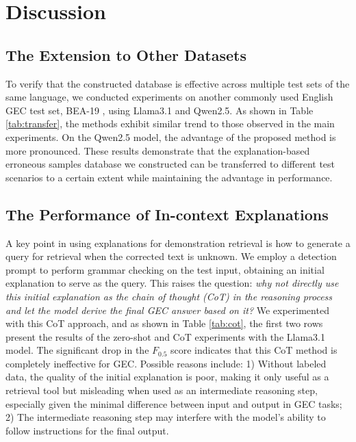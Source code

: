 

\section{Discussion}
\subsection{The Extension to Other Datasets}



To verify that the constructed database is effective across multiple test sets of the same language, we conducted experiments on another commonly used English GEC test set, BEA-19 \cite{bryant-etal-2019-bea-19}, using Llama3.1 and Qwen2.5. As shown in Table \ref{tab:transfer}, the methods exhibit similar trend to those observed in the main experiments. On the Qwen2.5 model, the advantage of the proposed method is more pronounced. These results demonstrate that the explanation-based erroneous samples database we constructed can be transferred to different test scenarios to a certain extent while maintaining the advantage in performance.


\subsection{The Performance of In-context Explanations}
\label{sec:in-context-explanation}
A key point in using explanations for demonstration retrieval is how to generate a query for retrieval when the corrected text is unknown. We employ a detection prompt to perform grammar checking on the test input, obtaining an initial explanation to serve as the query. This raises the question: \textit{why not directly use this initial explanation as the chain of thought (CoT) in the reasoning process and let the model derive the final GEC answer based on it?} We experimented with this CoT approach, and as shown in Table \ref{tab:cot}, the first two rows present the results of the zero-shot and CoT experiments with the Llama3.1 model. The significant drop in the $F_{0.5}$ score indicates that this CoT method is completely ineffective for GEC. Possible reasons include: 1) Without labeled data, the quality of the initial explanation is poor, making it only useful as a retrieval tool but misleading when used as an intermediate reasoning step, especially given the minimal difference between input and output in GEC tasks; 2) The intermediate reasoning step may interfere with the model’s ability to follow instructions for the final output.

